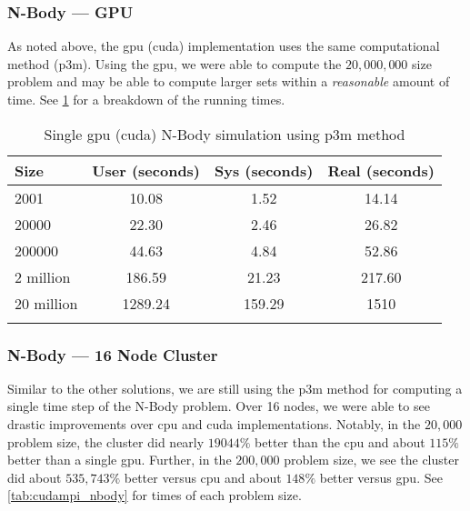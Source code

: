 \subsubsection{N-Body --- GPU}

As noted above, the \gls{gpu} (\gls{cuda}) implementation uses the same
computational method (\gls{p3m}). Using the \gls{gpu}, we were able to compute
the $ 20,000,000 $ size problem and may be able to compute larger sets within a
\emph{reasonable} amount of time. See \cref{tab:gpu_nbody} for a breakdown of
the running times.

\begin{table}[htb]
\centering{}
\begin{tabular}{lccc}
\toprule{}
\textbf{Size} & \textbf{User (seconds)} &
\textbf{Sys (seconds)} & \textbf{Real (seconds)} \\
\midrule{}
2001          & 10.08   & 1.52    & 14.14  \\
\midrule{}
20000         & 22.30   & 2.46    & 26.82  \\
\midrule{}
200000        & 44.63   & 4.84    & 52.86  \\
\midrule{}
2 million     & 186.59  & 21.23   & 217.60 \\
\midrule{}
20 million    & 1289.24 & 159.29  & 1510   \\
\bottomrule{}
\end{tabular}
\caption{Single \gls{gpu} (\gls{cuda}) N-Body simulation using \gls{p3m}
method}
\label{tab:gpu_nbody}
\end{table}

\subsubsection{N-Body --- 16 Node Cluster}

Similar to the other solutions, we are still using the \gls{p3m} method for
computing a single time step of the N-Body problem. Over 16 nodes, we were able
to see drastic improvements over \gls{cpu} and \gls{cuda} implementations.
Notably, in the $20,000$ problem size, the \gls{cluster} did nearly $19044\%$
better than the \gls{cpu} and about $115\%$ better than a single \gls{gpu}.
Further, in the $200,000$ problem size, we see the \gls{cluster} did about
$535,743\%$ better versus \gls{cpu} and about $148\%$ better versus \gls{gpu}.
See \cref{tab:cudampi_nbody} for times of each problem size.

